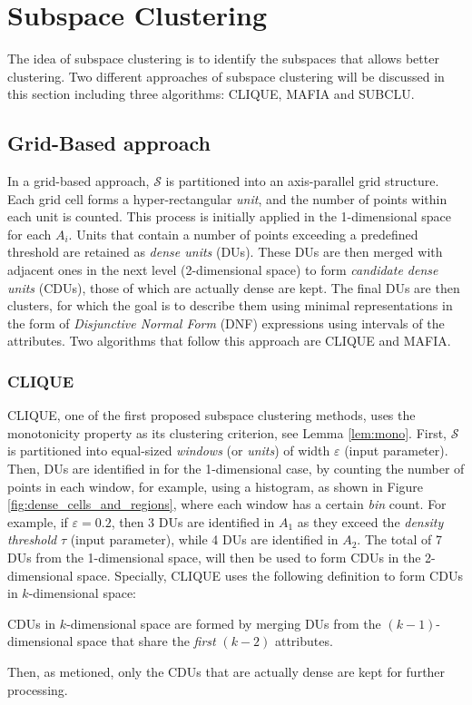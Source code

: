 \section{Subspace Clustering}
The idea of subspace clustering is to identify the subspaces that allows better clustering. Two different approaches of subspace clustering will be discussed in this section including three algorithms: CLIQUE, MAFIA and SUBCLU.

\subsection{Grid-Based approach}
In a grid-based approach, $\mathcal{S}$ is partitioned into an axis-parallel grid structure. Each grid cell forms a hyper-rectangular \textit{unit}, and the number of points within each unit is counted. This process is initially applied in the 1-dimensional space for each $A_i$. Units that contain a number of points exceeding a predefined threshold are retained as \textit{dense units} (DUs). These DUs are then merged with adjacent ones in the next level (2-dimensional space) to form \textit{candidate dense units} (CDUs), those of which are actually dense are kept. The final DUs are then clusters, for which the goal is to describe them using minimal representations in the form of \textit{Disjunctive Normal Form} (DNF) expressions using intervals of the attributes. Two algorithms that follow this approach are CLIQUE and MAFIA.

\subsubsection{CLIQUE}
CLIQUE, one of the first proposed subspace clustering methods, uses the monotonicity property as its clustering criterion, see Lemma \ref{lem:mono}. First, $\mathcal{S}$ is partitioned into equal-sized \textit{windows} (or \textit{units}) of width $\varepsilon$ (input parameter). Then, DUs are identified in for the 1-dimensional case, by counting the number of points in each window, for example, using a histogram, as shown in Figure \ref{fig:dense_cells_and_regions}, where each window has a certain \textit{bin} count. For example, if $\varepsilon = 0.2$, then 3 DUs are identified in $A_1$ as they exceed the \textit{density threshold} $\tau$ (input parameter), while 4 DUs are identified in $A_2$. The total of 7 DUs from the 1-dimensional space, will then be used to form CDUs in the 2-dimensional space. Specially, CLIQUE uses the following definition to form CDUs in $k$-dimensional space:
\begin{definition}
    CDUs in $k$-dimensional space are formed by merging DUs from the $(k-1)$-dimensional space that share the \textit{first} $(k-2)$ attributes.
\end{definition}
Then, as metioned, only the CDUs that are actually dense are kept for further processing.

